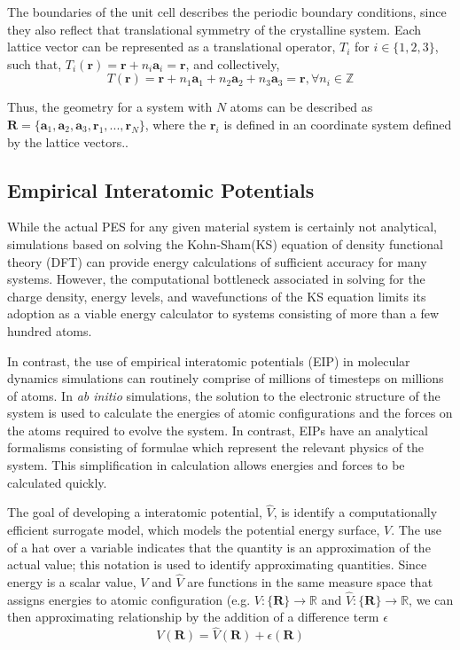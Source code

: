 The boundaries of the unit cell describes the periodic boundary conditions, since they also reflect that translational symmetry of the crystalline system.
Each lattice vector can be represented as a translational operator, $T_i$ for ${i\in\{1,2,3\}}$, such that, $T_i(\bm{r})=\bm{r} + n_i \bm{a}_i = \bm{r}$, and collectively,
\begin{equation}
    T(\bm{r}) = \bm{r}
		    + n_1 \bm{a}_1
		    + n_2 \bm{a}_2
		    + n_3 \bm{a}_3 = \bm{r}, \forall n_i \in \mathbb{Z}
\end{equation}

Thus, the geometry for a system with $N$ atoms can be described as
	$\bm{R} = \{\bm{a}_1,\bm{a}_2,\bm{a}_3,\bm{r}_1,...,\bm{r}_N\}$,
	where the $\bm{r}_i$ is defined in an coordinate system defined by the lattice vectors..
\subsection{Empirical Interatomic Potentials}

While the actual PES for any given material system is certainly not analytical, simulations based on solving the Kohn-Sham(KS) equation of density functional theory (DFT) can provide energy calculations of sufficient accuracy for many systems.  However, the computational bottleneck associated in solving for the charge density, energy levels, and wavefunctions of the KS equation limits its adoption as a viable energy calculator to systems consisting of more than a few hundred atoms.

In contrast, the use of empirical interatomic potentials (EIP) in molecular dynamics simulations can routinely comprise of millions of timesteps on millions of atoms.  In \emph{ab initio} simulations, the solution to the electronic structure of the system is used to calculate the energies of atomic configurations and the forces on the atoms required to evolve the system. In contrast, EIPs have an analytical formalisms consisting of formulae which represent the relevant physics of the system.  This simplification in calculation allows energies and forces to be calculated quickly.

The goal of developing a interatomic potential, $\hat{V}$, is identify a computationally efficient surrogate model, which models the potential energy surface, $V$.  The use of a hat over a variable indicates that the quantity is an approximation of the actual value; this notation is used to identify approximating quantities.
Since energy is a scalar value, $V$ and $\hat{V}$ are functions in the same measure space that assigns energies to atomic configuration (e.g. ${V:\{\bm{R}\}\rightarrow \mathbb{R}}$ and ${\hat{V}:\{\bm{R}\} \rightarrow \mathbb{R}}$, we can then approximating relationship by the addition of a difference term $\epsilon$
\begin{equation}\label{eq:pes_approximation}
    V(\bm{R}) = \hat{V}(\bm{R}) + \epsilon(\bm{R})
\end{equation}

